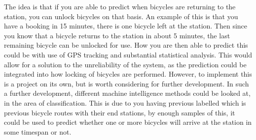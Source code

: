 \begin{description}[style=nextline]
		\item[Prediction]
		The idea is that if you are able to predict when bicycles are returning to the station, you can unlock bicycles on that basis.
		An example of this is that you have a booking in 15 minutes, there is one bicycle left at the station. Then since you know that a bicycle returns to the station in about 5 minutes, the last remaining bicycle can be unlocked for use.
		How you are then able to predict this could be with use of GPS tracking and substantial statistical analysis.
		This would allow for a solution to the unreliability of the system, as the prediction could be integrated into how locking of bicycles are performed.
		However, to implement this is a project on its own, but is worth considering for further development.
		In such a further development, different machine intelligence methods could be looked at, in the area of classification.
		This is due to you having previous labelled which is previous bicycle routes with their end stations, by enough samples of this, it could be used to predict whether one or more bicycles will arrive at the station in some timespan or not.
\end{description}

